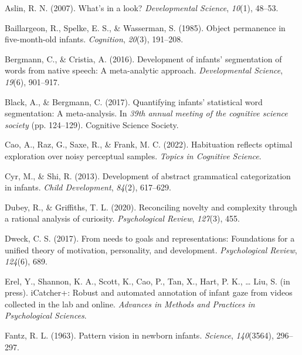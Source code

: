 \documentclass[10pt, letterpaper]{article}
\newenvironment{CSLReferences}%
  {}%
  {\par}
\begin{document}
\hypertarget{refs}{}
\begin{CSLReferences}{1}{0}
\leavevmode{}%
Aslin, R. N. (2007). What's in a look? \emph{Developmental Science},
\emph{10}(1), 48--53.

\leavevmode{}%
Baillargeon, R., Spelke, E. S., \& Wasserman, S. (1985). Object
permanence in five-month-old infants. \emph{Cognition}, \emph{20}(3),
191--208.

\leavevmode{}%
Bergmann, C., \& Cristia, A. (2016). Development of infants'
segmentation of words from native speech: A meta-analytic approach.
\emph{Developmental Science}, \emph{19}(6), 901--917.

\leavevmode{}%
Black, A., \& Bergmann, C. (2017). Quantifying infants' statistical word
segmentation: A meta-analysis. In \emph{39th annual meeting of the
cognitive science society} (pp. 124--129). Cognitive Science Society.

\leavevmode{}%
Cao, A., Raz, G., Saxe, R., \& Frank, M. C. (2022). Habituation reflects
optimal exploration over noisy perceptual samples. \emph{Topics in
Cognitive Science}.

\leavevmode{}%
Cyr, M., \& Shi, R. (2013). Development of abstract grammatical
categorization in infants. \emph{Child Development}, \emph{84}(2),
617--629.

\leavevmode{}%
Dubey, R., \& Griffiths, T. L. (2020). Reconciling novelty and
complexity through a rational analysis of curiosity. \emph{Psychological
Review}, \emph{127}(3), 455.

\leavevmode{}%
Dweck, C. S. (2017). From needs to goals and representations:
Foundations for a unified theory of motivation, personality, and
development. \emph{Psychological Review}, \emph{124}(6), 689.

\leavevmode{}%
Erel, Y., Shannon, K. A., Scott, K., Cao, P., Tan, X., Hart, P. K.,
\ldots{} Liu, S. (in press). iCatcher+: Robust and automated annotation
of infant gaze from videos collected in the lab and online.
\emph{Advances in Methods and Practices in Psychological Sciences}.

\leavevmode{}%
Fantz, R. L. (1963). Pattern vision in newborn infants. \emph{Science},
\emph{140}(3564), 296--297.


\end{CSLReferences}
\end{document}
